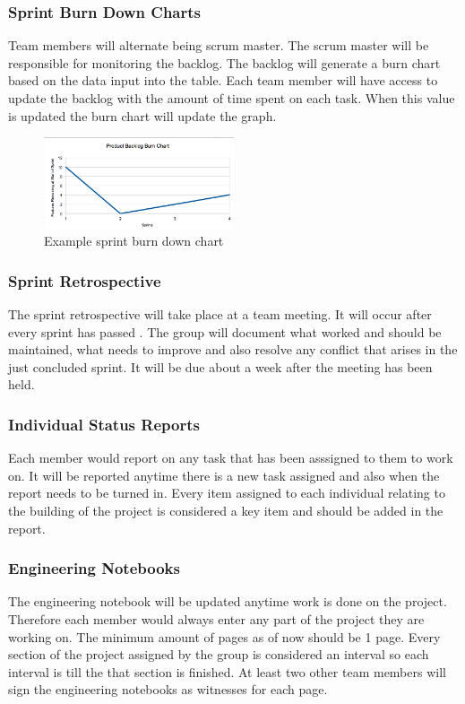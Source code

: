 \subsubsection{Sprint Burn Down Charts}
Team members will alternate being scrum master. The scrum master will be responsible for monitoring the backlog. The backlog will generate a burn chart based on the data input into the table. Each team member will have access to update the backlog with the amount of time spent on each task. When this value is updated the burn chart will update the graph.

\begin{figure}[h!]
    \centering
    \includegraphics[width=0.5\textwidth]{images/burn_down_chart_example}
    \caption{Example sprint burn down chart}
\end{figure}

\subsubsection{Sprint Retrospective}
The sprint retrospective will take place at a team meeting. It will occur after every sprint has passed . The group will document what worked and should be maintained, what needs to improve and also resolve any conflict that arises in the just concluded sprint. It will be due about a week after the meeting has been held.

\subsubsection{Individual Status Reports}
Each member would report on any task that has been asssigned to them to work on. It will be reported anytime there is a new task assigned and also when the report needs to be turned in. Every item assigned to each individual relating to the building of the project is considered a key item and should be added in the report.

\subsubsection{Engineering Notebooks}
The engineering notebook will be updated anytime work is done on the project. Therefore each member would always enter any part of the project they are working on. The minimum amount of pages as of now should be 1 page. Every section of the project assigned by the group is considered an interval so each interval is till the that section is finished. At least two other team members will sign the engineering notebooks as witnesses for each page.

